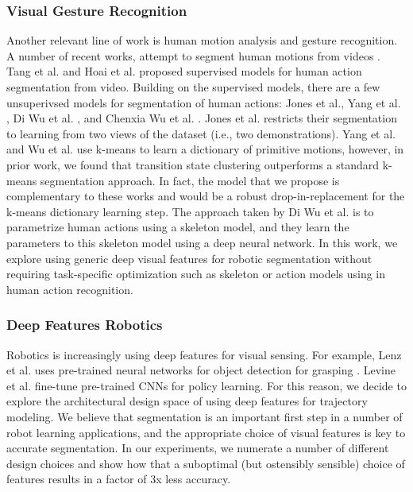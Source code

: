 \documentclass[0-main.tex]{subfiles}
\begin{document}
\subsubsection{Visual Gesture Recognition}
Another relevant line of work is human motion analysis and gesture recognition.
A number of recent works, attempt to segment human motions from videos \cite{hoai2011joint, tang2012learning, yang2013discovering, jones2014unsupervised, wu2014leveraging, wu2015watch}.
Tang et al. and Hoai et al. proposed supervised models for human action segmentation from video.
Building on the supervised models, there are a few unsuperivsed models for segmentation of human actions: Jones et al.\cite{jones2014unsupervised}, Yang et al. \cite{yang2013discovering}, Di Wu et al. \cite{wu2014leveraging} , and Chenxia Wu et al. \cite{wu2015watch}.
Jones et al. \cite{jones2014unsupervised} restricts their segmentation to learning from two views of the dataset (i.e., two demonstrations).
Yang et al. \cite{yang2013discovering} and Wu et al.  \cite{wu2015watch} use k-means to learn a dictionary of primitive motions, however, in prior work, we found that transition state clustering outperforms a standard k-means segmentation approach.
In fact, the model that we propose is complementary to these works and would be a robust drop-in-replacement for the k-means dictionary learning step.
The approach taken by Di Wu et al. is to parametrize human actions using a skeleton model, and they learn the parameters to this skeleton model using a deep neural network.
In this work, we explore using generic deep visual features for robotic segmentation without requiring task-specific optimization such as skeleton or action models using in human action recognition.

\subsubsection{Deep Features Robotics}
Robotics is increasingly using deep features for visual sensing. For example, Lenz et al. uses pre-trained neural networks for object detection for grasping \cite{lenz2015deep}.
Levine et al. \cite{levine2015end} fine-tune pre-trained CNNs for policy learning.
For this reason, we decide to explore the architectural design space of using deep features for trajectory modeling.
We believe that segmentation is an important first step in a number of robot learning applications, and the appropriate choice of visual features is key to accurate segmentation.
In our experiments, we numerate a number of different design choices and show how that a suboptimal (but ostensibly sensible) choice of features results in a factor of 3x less accuracy.
\end{document}
